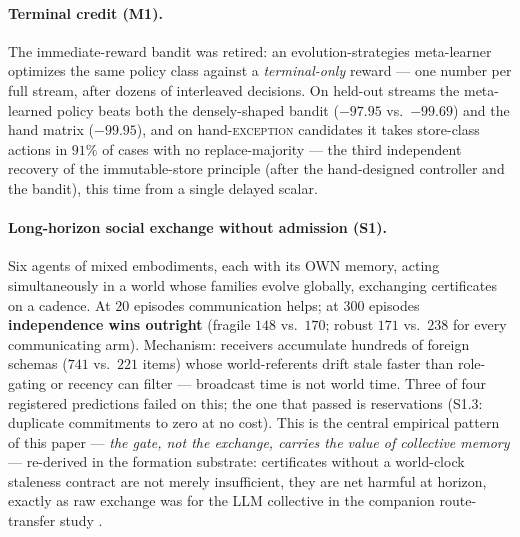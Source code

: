\documentclass{article}
\begin{document}
\paragraph{Terminal credit (M1).} The immediate-reward bandit was
retired: an evolution-strategies meta-learner optimizes the same
policy class against a \emph{terminal-only} reward --- one number per
full stream, after dozens of interleaved decisions. On held-out
streams the meta-learned policy beats both the densely-shaped bandit
($-97.95$ vs.\ $-99.69$) and the hand matrix ($-99.95$), and on
hand-\textsc{exception} candidates it takes store-class actions in
$91\%$ of cases with no replace-majority --- the third independent
recovery of the immutable-store principle (after the hand-designed controller and
the bandit), this time from a single delayed scalar.

\paragraph{Long-horizon social exchange without admission (S1).} Six
agents of mixed embodiments, each with its OWN memory, acting
simultaneously in a world whose families evolve globally, exchanging
certificates on a cadence. At $20$ episodes communication helps; at
$300$ episodes \textbf{independence wins outright} (fragile $148$
vs.\ $170$; robust $171$ vs.\ $238$ for every communicating arm).
Mechanism: receivers accumulate hundreds of foreign schemas ($741$
vs.\ $221$ items) whose world-referents drift stale faster than
role-gating or recency can filter --- broadcast time is not world
time. Three of four registered predictions failed on this; the one
that passed is reservations (S1.3: duplicate commitments to zero at
no cost). This is the central empirical pattern of this paper --- \emph{the gate, not the
exchange, carries the value of collective memory} --- re-derived in
the formation substrate: certificates without a world-clock
staleness contract are not merely insufficient, they are net harmful
at horizon, exactly as raw exchange was for the LLM collective in the companion route-transfer study \citep{songlines2}.
\end{document}
